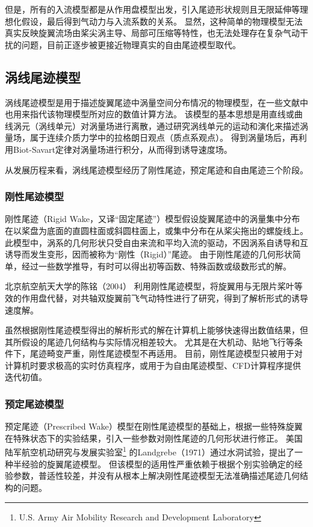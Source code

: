 \documentclass[doctor,openright,twoside,color]{buaathesis}
\begin{document}
但是，所有的入流模型都是从作用盘模型出发，引入尾迹形状规则且无限延伸等理想化假设，最后得到气动力与入流系数的关系。
显然，这种简单的物理模型无法真实反映旋翼流场由桨尖涡主导、局部可压缩等特性，也无法处理存在复杂气动干扰的问题，目前正逐步被更接近物理真实的自由尾迹模型取代。

\subsection{涡线尾迹模型}
涡线尾迹模型是用于描述旋翼尾迹中涡量空间分布情况的物理模型，在一些文献中也用来指代该物理模型所对应的数值计算方法。
该模型的基本思想是用直线或曲线涡元（涡线单元）对涡量场进行离散，通过研究涡线单元的运动和演化来描述涡量场，属于连续介质力学中的拉格朗日观点（质点系观点）。
得到涡量场后，再利用Biot-Savart定律对涡量场进行积分，从而得到诱导速度场。

从发展历程来看，涡线尾迹模型经历了刚性尾迹，预定尾迹和自由尾迹三个阶段。

\subsubsection{刚性尾迹模型}
刚性尾迹（Rigid Wake，又译“固定尾迹”）模型假设旋翼尾迹中的涡量集中分布在以桨盘为底面的直圆柱面或斜圆柱面上，或集中分布在从桨尖拖出的螺旋线上。
此模型中，涡系的几何形状只受自由来流和平均入流的驱动，不因涡系自诱导和互诱导而发生变形，因而被称为“刚性（Rigid）”尾迹。
由于刚性尾迹的几何形状简单，经过一些数学推导，有时可以得出初等函数、特殊函数或级数形式的解。

北京航空航天大学的陈铭（2004）
利用刚性尾迹模型，将旋翼用与无限片桨叶等效的作用盘代替，对共轴双旋翼前飞气动特性进行了研究，得到了解析形式的诱导速度解。

虽然根据刚性尾迹模型得出的解析形式的解在计算机上能够快速得出数值结果，但其所假设的尾迹几何结构与实际情况相差较大。
尤其是在大机动、贴地飞行等条件下，尾迹畸变严重，刚性尾迹模型不再适用。
目前，刚性尾迹模型只被用于对计算机时要求极高的实时仿真程序，或用于为自由尾迹模型、CFD计算程序提供迭代初值。

\subsubsection{预定尾迹模型}
预定尾迹（Prescribed Wake）模型在刚性尾迹模型的基础上，根据一些特殊旋翼在特殊状态下的实验结果，引入一些参数对刚性尾迹的几何形状进行修正。
美国陆军航空机动研究与发展实验室\footnote{U.S. Army Air Mobility Research and Development Laboratory}
的Landgrebe（1971）通过水洞试验，提出了一种半经验的旋翼尾迹模型。
但该模型的适用性严重依赖于根据个别实验确定的经验参数，普适性较差，并没有从根本上解决刚性尾迹模型无法准确描述尾迹几何结构的问题。
\end{document}

